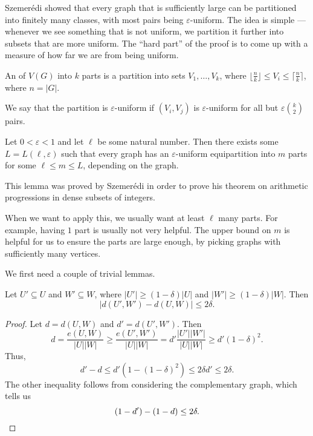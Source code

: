 \documentclass[a4paper]{article}
\begin{document}
Szemer\'edi showed that every graph that is sufficiently large can be partitioned into finitely many classes, with most pairs being $\varepsilon$-uniform. The idea is simple --- whenever we see something that is not uniform, we partition it further into subsets that are more uniform. The ``hard part'' of the proof is to come up with a measure of how far we are from being uniform.

\begin{defi}[Equipartition]
  An  of $V(G)$ into $k$ parts is a partition into sets $V_1, \ldots, V_k$, where $\lfloor \frac{n}{k} \rfloor \leq V_i \leq \lceil \frac{n}{k}\rceil$, where $n = |G|$.

  We say that the partition is $\varepsilon$-uniform if $(V_i, V_j)$ is $\varepsilon$-uniform for all but $\varepsilon \binom{k}{2}$ pairs.
\end{defi}


\begin{thm}
  Let $0 < \varepsilon < 1$ and let $\ell$ be some natural number. Then there exists some $L = L(\ell, \varepsilon)$ such that every graph has an $\varepsilon$-uniform equipartition into $m$ parts for some $\ell \leq m \leq L$, depending on the graph.
\end{thm}
This lemma was proved by Szemer\'edi in order to prove his theorem on arithmetic progressions in dense subsets of integers.

When we want to apply this, we usually want at least $\ell$ many parts. For example, having $1$ part is usually not very helpful. The upper bound on $m$ is helpful for us to ensure the parts are large enough, by picking graphs with sufficiently many vertices.

We first need a couple of trivial lemmas.
\begin{lemma}
  Let $U' \subseteq U$ and $W' \subseteq W$, where $|U'| \geq (1 - \delta)|U|$ and $|W'| \geq (1 - \delta) |W|$. Then
  \[
    |d(U', W') - d(U, W)| \leq 2\delta.
  \]
\end{lemma}

\begin{proof}
  Let $d = d(U, W)$ and $d' = d(U', W')$. Then
  \[
    d = \frac{e(U, W)}{|U||W|} \geq \frac{e(U', W')}{|U||W|} = d' \frac{|U'||W'|}{|U||W|} \geq d' (1 - \delta)^2.
  \]
  Thus,
  \[
    d' - d \leq d'(1 - (1 - \delta)^2) \leq 2\delta d' \leq 2 \delta.
  \]
  The other inequality follows from considering the complementary graph, which tells us
  \[
    (1 - d') - (1 - d) \leq 2\delta.\qedhere
  \]
\end{proof}
\end{document}
